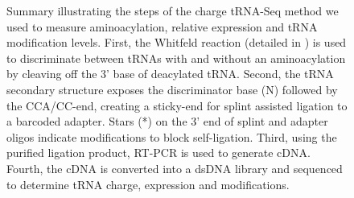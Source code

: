 \documentclass[9pt,lineno]{elife}
\begin{document}
\begin{figure}[ht!]
\centering
{}
\caption{
Summary illustrating the steps of the charge tRNA-Seq method we used to measure aminoacylation, relative expression and tRNA modification levels.
First, the Whitfeld reaction (detailed in ) is used to discriminate between tRNAs with and without an aminoacylation by cleaving off the 3’ base of deacylated tRNA.
Second, the tRNA secondary structure exposes the discriminator base (N) followed by the CCA/CC-end, creating a sticky-end for splint assisted ligation to a barcoded adapter.
Stars (*) on the 3’ end of splint and adapter oligos indicate modifications to block self-ligation.
Third, using the purified ligation product, RT-PCR is used to generate cDNA.
Fourth, the cDNA is converted into a dsDNA library and sequenced to determine tRNA charge, expression and modifications.
}
\label{fig:Fig1}

\label{figsupp:f1S1}
\end{figure}
\end{document}

